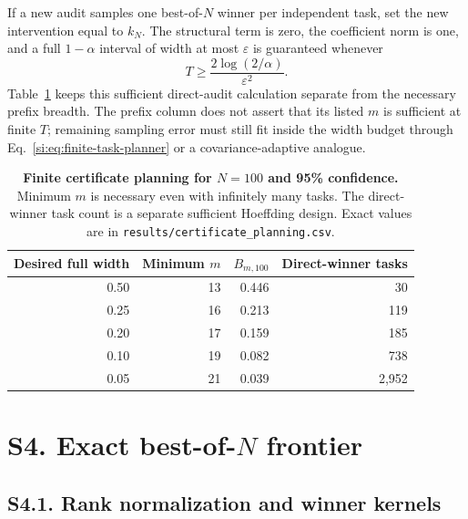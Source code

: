 \documentclass[10pt,twocolumn]{article}
\begin{document}
If a new audit samples one best-of-$N$ winner per independent task, set the new intervention equal to $k_N$. The structural term is zero, the coefficient norm is one, and a full $1-\alpha$ interval of width at most $\varepsilon$ is guaranteed whenever
\begin{equation}
T\ge\frac{2\log(2/\alpha)}{\varepsilon^2}.
\label{si:eq:direct-task-count}
\end{equation}
Table~\ref{si:tab:certificate-planner} keeps this sufficient direct-audit calculation separate from the necessary prefix breadth. The prefix column does not assert that its listed $m$ is sufficient at finite $T$; remaining sampling error must still fit inside the width budget through Eq.~\ref{si:eq:finite-task-planner} or a covariance-adaptive analogue.

\begin{table}[h]
\centering
\caption{\textbf{Finite certificate planning for $N=100$ and 95\% confidence.} Minimum $m$ is necessary even with infinitely many tasks. The direct-winner task count is a separate sufficient Hoeffding design. Exact values are in \texttt{results/certificate\_planning.csv}.}
\label{si:tab:certificate-planner}
\begin{tabular}{rrrr}
\toprule
Desired full width & Minimum $m$ & $B_{m,100}$ & Direct-winner tasks \\
\midrule
0.50 & 13 & 0.446 & 30 \\
0.25 & 16 & 0.213 & 119 \\
0.20 & 17 & 0.159 & 185 \\
0.10 & 19 & 0.082 & 738 \\
0.05 & 21 & 0.039 & 2,952 \\
\bottomrule
\end{tabular}
\end{table}

\section*{S4. Exact best-of-$N$ frontier}

\subsection*{S4.1. Rank normalization and winner kernels}
\end{document}
